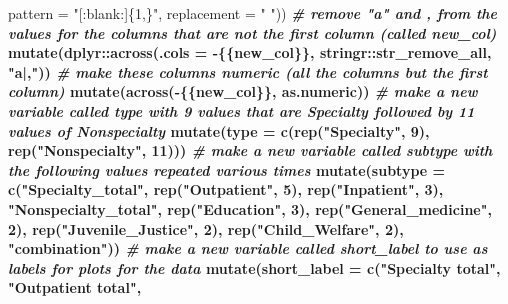 \documentclass[
]{article}
\newenvironment{Shaded}{\begin{snugshade}}{\end{snugshade}}
\newcommand{\CommentTok}[1]{\textcolor[rgb]{0.56,0.35,0.01}{\textit{#1}}}
\newcommand{\DataTypeTok}[1]{\textcolor[rgb]{0.13,0.29,0.53}{#1}}
\newcommand{\DecValTok}[1]{\textcolor[rgb]{0.00,0.00,0.81}{#1}}
\newcommand{\KeywordTok}[1]{\textcolor[rgb]{0.13,0.29,0.53}{\textbf{#1}}}
\newcommand{\NormalTok}[1]{#1}
\newcommand{\OperatorTok}[1]{\textcolor[rgb]{0.81,0.36,0.00}{\textbf{#1}}}
\newcommand{\StringTok}[1]{\textcolor[rgb]{0.31,0.60,0.02}{#1}}
\begin{document}
\begin{Shaded}
\begin{Highlighting}[]
{{{{{{{{                         \DataTypeTok{pattern =} \StringTok{"[:blank:]\{1,\}"}\NormalTok{, }
                         \DataTypeTok{replacement =} \StringTok{" "}\NormalTok{)) }\OperatorTok{%>%}
\CommentTok{# remove "a" and , from the values for the columns that are not the first column (called new_col)}
\StringTok{    }\KeywordTok{mutate}\NormalTok{(dplyr}\OperatorTok{::}\KeywordTok{across}\NormalTok{(}\DataTypeTok{.cols =} \OperatorTok{-}\NormalTok{\{\{new_col\}\},}
\NormalTok{                       stringr}\OperatorTok{::}\NormalTok{str_remove_all, }\StringTok{"a|,"}\NormalTok{)) }\OperatorTok{%>%}
\CommentTok{# make these columns numeric  (all the columns but the first column)}
\StringTok{    }\KeywordTok{mutate}\NormalTok{(}\KeywordTok{across}\NormalTok{(}\OperatorTok{-}\NormalTok{\{\{new_col\}\}, as.numeric)) }\OperatorTok{%>%}
\CommentTok{# make a new variable called type with 9 values that are Specialty followed by 11 values of Nonspecialty}
\StringTok{    }\KeywordTok{mutate}\NormalTok{(}\DataTypeTok{type =} \KeywordTok{c}\NormalTok{(}\KeywordTok{rep}\NormalTok{(}\StringTok{"Specialty"}\NormalTok{, }\DecValTok{9}\NormalTok{), }\KeywordTok{rep}\NormalTok{(}\StringTok{"Nonspecialty"}\NormalTok{, }\DecValTok{11}\NormalTok{))) }\OperatorTok{%>%}
\CommentTok{# make a new variable called subtype with the following values repeated various times}
\StringTok{    }\KeywordTok{mutate}\NormalTok{(}\DataTypeTok{subtype =} \KeywordTok{c}\NormalTok{(}\StringTok{"Specialty_total"}\NormalTok{,}
                       \KeywordTok{rep}\NormalTok{(}\StringTok{"Outpatient"}\NormalTok{, }\DecValTok{5}\NormalTok{),}
                       \KeywordTok{rep}\NormalTok{(}\StringTok{"Inpatient"}\NormalTok{, }\DecValTok{3}\NormalTok{),}
                       \StringTok{"Nonspecialty_total"}\NormalTok{,}
                       \KeywordTok{rep}\NormalTok{(}\StringTok{"Education"}\NormalTok{, }\DecValTok{3}\NormalTok{),}
                       \KeywordTok{rep}\NormalTok{(}\StringTok{"General_medicine"}\NormalTok{, }\DecValTok{2}\NormalTok{),}
                       \KeywordTok{rep}\NormalTok{(}\StringTok{"Juvenile_Justice"}\NormalTok{, }\DecValTok{2}\NormalTok{),}
                       \KeywordTok{rep}\NormalTok{(}\StringTok{"Child_Welfare"}\NormalTok{, }\DecValTok{2}\NormalTok{),}
                       \StringTok{"combination"}\NormalTok{)) }\OperatorTok{%>%}\StringTok{ }
\CommentTok{# make a new variable called short_label to use as labels for plots for the data}
\StringTok{    }\KeywordTok{mutate}\NormalTok{(}\DataTypeTok{short_label =} \KeywordTok{c}\NormalTok{(}\StringTok{"Specialty total"}\NormalTok{, }\StringTok{"Outpatient total"}\NormalTok{,  }
}}}}}}}}}}}}}
\end{Highlighting}
\end{Shaded}
\end{document}

